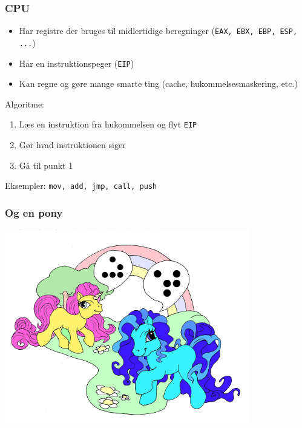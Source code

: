 \documentclass[slidestop,compress,mathserif, xcolor=table]{beamer}
\begin{document}
\begin{frame}[c]
    \frametitle{CPU}
    \begin{itemize}
        \pause
      \item Har registre der bruges til midlertidige beregninger (\texttt{EAX,
          EBX, EBP, ESP, ...})

        \pause
      \item Har en instruktionspeger (\texttt{EIP})

        \pause
      \item Kan regne og gøre mange smarte ting (cache, hukommelsesmaskering,
        etc.)
    \end{itemize}\vskip15pt

    \pause Algoritme:
    \begin{enumerate}
        \pause\item Læs en instruktion fra hukommelsen og flyt \texttt{EIP}
        \pause\item Gør hvad instruktionen siger
        \pause\item Gå til punkt 1
    \end{enumerate} \vskip15pt

    \pause Eksempler: \texttt{mov, add, jmp, call, push}

\end{frame}

\begin{frame}[c]
    \frametitle{Og en pony}
    \includegraphics[width=0.8\textwidth]{pony2}
\end{frame}
\end{document}
